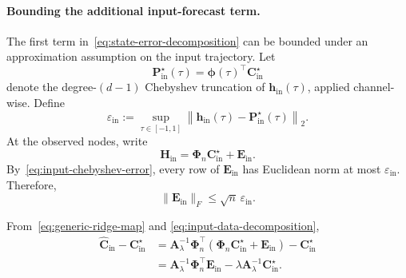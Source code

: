 \paragraph{Bounding the additional input-forecast term.}
The first term in~\eqref{eq:state-error-decomposition} can be bounded
under an approximation assumption on the input trajectory. Let
\begin{equation}
\mathbf{P}_{\mathrm{in}}^\star(\tau)
=
\boldsymbol{\phi}(\tau)^\top
\mathbf{C}_{\mathrm{in}}^\star
\label{eq:input-chebyshev-projection}
\end{equation}
denote the degree-$(d-1)$ Chebyshev truncation of
$\mathbf{h}_{\mathrm{in}}(\tau)$, applied channel-wise. Define
\begin{equation}
\varepsilon_{\mathrm{in}}
:=
\sup_{\tau\in[-1,1]}
\left\|
\mathbf{h}_{\mathrm{in}}(\tau)
-
\mathbf{P}_{\mathrm{in}}^\star(\tau)
\right\|_2.
\label{eq:input-chebyshev-error}
\end{equation}
At the observed nodes, write
\begin{equation}
\mathbf{H}_{\mathrm{in}}
=
\mathbf{\Phi}_n
\mathbf{C}_{\mathrm{in}}^\star
+
\mathbf{E}_{\mathrm{in}}.
\label{eq:input-data-decomposition}
\end{equation}
By~\eqref{eq:input-chebyshev-error}, every row of
$\mathbf{E}_{\mathrm{in}}$ has Euclidean norm at most
$\varepsilon_{\mathrm{in}}$. Therefore,
\begin{equation}
\|\mathbf{E}_{\mathrm{in}}\|_F
\leq
\sqrt{n}\,
\varepsilon_{\mathrm{in}}.
\label{eq:input-error-matrix-bound}
\end{equation}

From~\eqref{eq:generic-ridge-map} and
\eqref{eq:input-data-decomposition},
\begin{align}
\widehat{\mathbf{C}}_{\mathrm{in}}
-
\mathbf{C}_{\mathrm{in}}^\star
&=
\mathbf{A}_\lambda^{-1}
\mathbf{\Phi}_n^\top
\left(
\mathbf{\Phi}_n
\mathbf{C}_{\mathrm{in}}^\star
+
\mathbf{E}_{\mathrm{in}}
\right)
-
\mathbf{C}_{\mathrm{in}}^\star
\nonumber\\
&=
\mathbf{A}_\lambda^{-1}
\mathbf{\Phi}_n^\top
\mathbf{E}_{\mathrm{in}}
-
\lambda
\mathbf{A}_\lambda^{-1}
\mathbf{C}_{\mathrm{in}}^\star.
\label{eq:input-coefficient-error}
\end{align}

